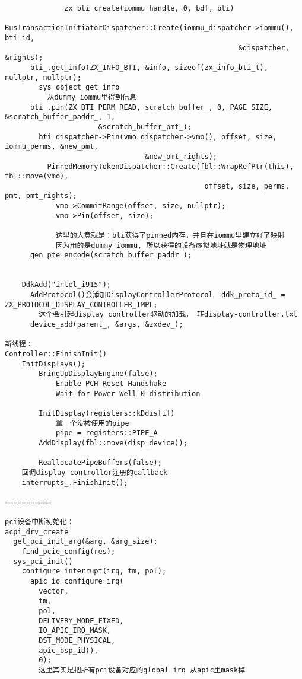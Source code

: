 \begin{verbatim}
              zx_bti_create(iommu_handle, 0, bdf, bti)
                BusTransactionInitiatorDispatcher::Create(iommu_dispatcher->iommu(), bti_id,
                                                       &dispatcher, &rights);
      bti_.get_info(ZX_INFO_BTI, &info, sizeof(zx_info_bti_t), nullptr, nullptr);
        sys_object_get_info
          从dummy iommu里得到信息
      bti_.pin(ZX_BTI_PERM_READ, scratch_buffer_, 0, PAGE_SIZE, &scratch_buffer_paddr_, 1,
                      &scratch_buffer_pmt_);
        bti_dispatcher->Pin(vmo_dispatcher->vmo(), offset, size, iommu_perms, &new_pmt,
                                 &new_pmt_rights);
          PinnedMemoryTokenDispatcher::Create(fbl::WrapRefPtr(this), fbl::move(vmo),
                                               offset, size, perms, pmt, pmt_rights);                                    
            vmo->CommitRange(offset, size, nullptr);
            vmo->Pin(offset, size);

            这里的大意就是：bti获得了pinned内存，并且在iommu里建立好了映射
            因为用的是dummy iommu, 所以获得的设备虚拟地址就是物理地址
      gen_pte_encode(scratch_buffer_paddr_);


    DdkAdd("intel_i915");
      AddProtocol()会添加DisplayControllerProtocol  ddk_proto_id_ = ZX_PROTOCOL_DISPLAY_CONTROLLER_IMPL;
        这个会引起display controller驱动的加载， 转display-controller.txt
      device_add(parent_, &args, &zxdev_);

新线程：
Controller::FinishInit()
    InitDisplays();
        BringUpDisplayEngine(false);
            Enable PCH Reset Handshake
            Wait for Power Well 0 distribution

        InitDisplay(registers::kDdis[i])
            拿一个没被使用的pipe
            pipe = registers::PIPE_A
        AddDisplay(fbl::move(disp_device));

        ReallocatePipeBuffers(false);
    回调display controller注册的callback
    interrupts_.FinishInit();

===========

pci设备中断初始化：
acpi_drv_create
  get_pci_init_arg(&arg, &arg_size);
    find_pcie_config(res);
  sys_pci_init()
    configure_interrupt(irq, tm, pol);
      apic_io_configure_irq(
        vector,
        tm,
        pol,
        DELIVERY_MODE_FIXED,
        IO_APIC_IRQ_MASK,
        DST_MODE_PHYSICAL,
        apic_bsp_id(),
        0);
        这里其实是把所有pci设备对应的global irq 从apic里mask掉
  



\end{verbatim}
